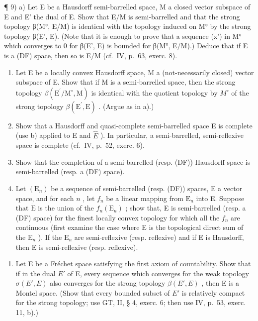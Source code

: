 ¶ 9) a) Let E be a Hausdorff semi-barrelled space, M a closed vector subspace of E and E' the dual of E. Show that E/M is semi-barrelled and that the strong topology β(M°, E/M) is identical with the topology induced on M° by the strong topology β(E', E). (Note that it is enough to prove that a sequence (x') in M° which converges to 0 for β(E', E) is bounded for β(M°, E/M).) Deduce that if E is a (DF) space, then so is E/M (cf.~IV, p.~63, exerc. 8).

\begin{enumerate}
\def\labelenumi{\alph{enumi})}
\setcounter{enumi}{1}
\item
  Let E be a locally convex Hausdorff space, M a (not-necessarily closed) vector subspace of E. Show that if M is a semi-barrelled space, then the strong topology \(\beta(\mathrm{E}^{\prime}/\mathrm{M}^{\circ}, \mathrm{M})\) is identical with the quotient topology by \(M^{\circ}\) of the strong topology \(\beta(\mathrm{E}^{\prime}, \mathrm{E})\) . (Argue as in a).)
\item
  Show that a Hausdorff and quasi-complete semi-barrelled space E is complete (use b) applied to E and \(\hat{E}\) ). In particular, a semi-barrelled, semi-reflexive space is complete (cf.~IV, p.~52, exerc. 6).
\item
  Show that the completion of a semi-barrelled (resp. (DF)) Hausdorff space is semi-barrelled (resp. a (DF) space).
\item
  Let \((\mathrm{E}_n)\) be a sequence of semi-barrelled (resp. (DF)) spaces, E a vector space, and for each \(n\) , let \(f_n\) be a linear mapping from \(\mathrm{E}_n\) into E. Suppose that \(\dot{\mathrm{E}}\) is the union of the \(f_n(\mathrm{E}_n)\) ; show that, E is semi-barrelled (resp. a (DF) space) for the finest locally convex topology for which all the \(f_n\) are continuous (first examine the case where E is the topological direct sum of the \(\mathrm{E}_n\) ). If the \(\mathrm{E}_n\) are semi-reflexive (resp. reflexive) and if E is Hausdorff, then E is semi-reflexive (resp. reflexive).
\end{enumerate}

\begin{enumerate}
\def\labelenumi{\arabic{enumi})}
\setcounter{enumi}{9}
\tightlist
\item
  Let E be a Fréchet space satisfying the first axiom of countability. Show that if in the dual \(E'\) of E, every sequence which converges for the weak topology \(\sigma(E', E)\) also converges for the strong topology \(\beta(E', E)\) , then E is a Montel space. (Show that every bounded subset of \(E'\) is relatively compact for the strong topology; use GT, II, § 4, exerc. 6; then use IV, p.~53, exerc. 11, b).)
\end{enumerate}

